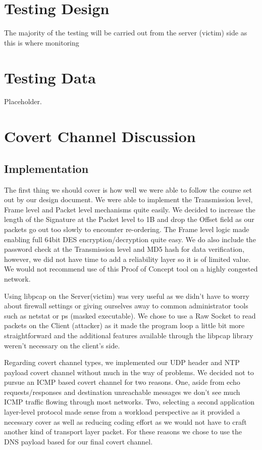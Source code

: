 \documentclass[titlepage]{article}
\begin{document}
\section{Testing Design}

The majority of the testing will be carried out from the server (victim) side as this is where monitoring

\section{Testing Data}

Placeholder.

\section{Covert Channel Discussion}

\subsection{Implementation}

The first thing we should cover is how well we were able to follow the course set out by our design document.  We were able to implement the Transmission level, Frame level and Packet level mechanisms quite easily.  We decided to increase the length of the Signature at the Packet level to 1B and drop the Offset field as our packets go out too slowly to encounter re-ordering.  The Frame level logic made enabling full 64bit DES encryption/decryption quite easy.  We do also include the password check at the Transmission level and MD5 hash for data verification, however, we did not have time to add a reliability layer so it is of limited value. We would not recommend use of this Proof of Concept tool on a highly congested network.

Using libpcap on the Server(victim) was very useful as we didn't have to worry about firewall settings or giving ourselves away to common administrator tools such as netstat or ps (masked executable).  We chose to use a Raw Socket to read packets on the Client (attacker) as it made the program loop a little bit more straightforward and the additional features available through the libpcap library weren't necessary on the client's side.

Regarding covert channel types, we implemented our UDP header and NTP payload covert channel without much in the way of problems.  We decided not to pursue an ICMP based covert channel for two reasons. One, aside from echo requests/responses and destination unreachable messages we don't see much ICMP traffic flowing through most networks. Two, selecting a second application layer-level protocol made sense from a workload perspective as it provided a necessary cover as well as reducing coding effort as we would not have to craft another kind of transport layer packet.  For these reasons we chose to use the DNS payload based for our final covert channel.
\end{document}
